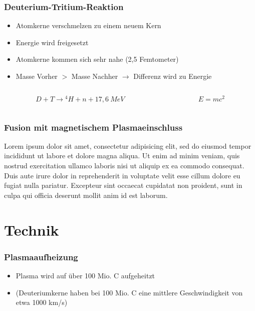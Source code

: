 \documentclass[aspectratio=169]{beamer}
\begin{document}
    \begin{frame}
      \frametitle{Deuterium-Tritium-Reaktion}
      \begin{itemize}
        \item Atomkerne verschmelzen zu einem neuem Kern
        \pause
        \item Energie wird freigesetzt
        \pause
        \item Atomkerne kommen sich sehr nahe (2,5 Femtometer)
        \pause
        \item Masse Vorher \( > \) Masse Nachher \( \rightarrow \) Differenz wird zu Energie
        \pause
      \end{itemize}
      \bigskip

      \begin{columns}[T]
        \begin{column}{0.5\textwidth}
          \begin{equation*}
            D + T \rightarrow {}^4 H + n + 17,6~MeV
          \end{equation*}
        \end{column}
        \begin{column}{0.5\textwidth}
          \begin{equation*}
            E = mc^2
          \end{equation*}
        \end{column}
      \end{columns}


    \end{frame}

    \begin{frame}
      \frametitle{Fusion mit magnetischem Plasmaeinschluss}
      Lorem ipsum dolor sit amet, consectetur adipisicing elit, sed do eiusmod tempor incididunt ut labore et dolore magna aliqua. Ut enim ad minim veniam, quis nostrud exercitation ullamco laboris nisi ut aliquip ex ea commodo consequat. Duis aute irure dolor in reprehenderit in voluptate velit esse cillum dolore eu fugiat nulla pariatur. Excepteur sint occaecat cupidatat non proident, sunt in culpa qui officia deserunt mollit anim id est laborum.
    \end{frame}

  \section{Technik}

    \begin{frame}
      \frametitle{Plasmaaufheizung}
      \begin{itemize}
        \item Plasma wird auf über 100 Mio. C aufgeheitzt
        \pause
        \item (Deuteriumkerne haben bei 100 Mio. C eine mittlere Geschwindigkeit von etwa 1000 km/s)
      \end{itemize}
    \end{frame}
\end{document}
